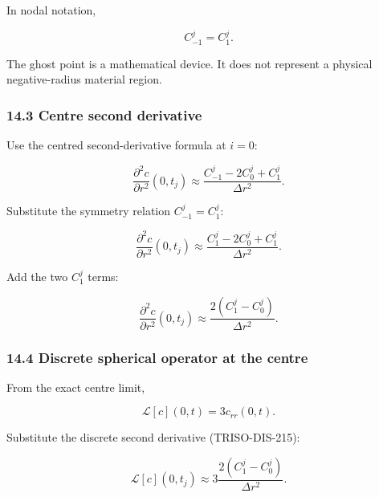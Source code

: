 \documentclass[11pt,a4paper]{article}
\begin{document}
In nodal notation,

\begin{equation}
\boxed{
C_{-1}^j=C_1^j.
}
\tag{TRISO-DIS-212}
\label{eq:triso-dis-212}
\end{equation}

The ghost point is a mathematical device. It does not represent a physical negative-radius material region.

\subsubsection*{14.3 Centre second derivative}

Use the centred second-derivative formula at $i=0$:

\begin{equation}
\frac{\partial^2c}{\partial r^2}(0,t_j)
\approx
\frac{
C_{-1}^j-2C_0^j+C_1^j
}{
\Delta r^2
}.
\tag{TRISO-DIS-213}
\label{eq:triso-dis-213}
\end{equation}

Substitute the symmetry relation $C_{-1}^j=C_1^j$:

\begin{equation}
\frac{\partial^2c}{\partial r^2}(0,t_j)
\approx
\frac{
C_1^j-2C_0^j+C_1^j
}{
\Delta r^2
}.
\tag{TRISO-DIS-214}
\label{eq:triso-dis-214}
\end{equation}

Add the two $C_1^j$ terms:

\begin{equation}
\boxed{
\frac{\partial^2c}{\partial r^2}(0,t_j)
\approx
\frac{
2(C_1^j-C_0^j)
}{
\Delta r^2
}.
}
\tag{TRISO-DIS-215}
\label{eq:triso-dis-215}
\end{equation}

\subsubsection*{14.4 Discrete spherical operator at the centre}

From the exact centre limit,

\begin{equation}
\mathcal L[c](0,t)
=
3c_{rr}(0,t).
\tag{TRISO-DIS-216}
\label{eq:triso-dis-216}
\end{equation}

Substitute the discrete second derivative (TRISO-DIS-215):

\begin{equation}
\mathcal L[c](0,t_j)
\approx
3
\frac{
2(C_1^j-C_0^j)
}{
\Delta r^2
}.
\tag{TRISO-DIS-217}
\label{eq:triso-dis-217}
\end{equation}
\end{document}
